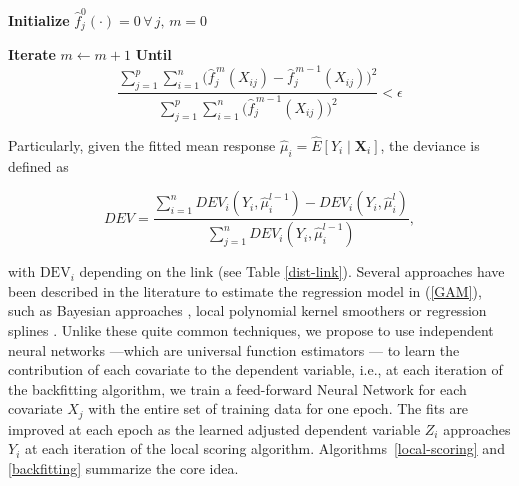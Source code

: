 \begin{algorithm}[ht!]

    \SetAlgoLined
    \caption{Backfitting Algorithm with neural networks}
    \label{backfitting}
        \textbf{Initialize} $\hat f_j^0(\cdot) = 0 \, \forall \, j, \, m = 0 $

        \textbf{Iterate} $m \gets m+1$
            \BlankLine
            \textbf{Until}
            \[
            \frac{ \sum_{j=1}^p \sum_{i=1}^n \bigl(\hat f_j^{\,m}(X_{ij}) - \hat f_j^{\,m-1}(X_{ij})\bigr)^2}
                 { \sum_{j=1}^p \sum_{i=1}^n \bigl(\hat f_j^{\,m-1}(X_{ij})\bigr)^2}
            < \epsilon
            \] \BlankLine
\end{algorithm}

Particularly, given the fitted mean response $\hat{\mu}_i = \hat E[Y_i \mid \textbf{X}_i]$, the deviance is defined as

\[DEV = \frac{\sum_{i=1}^n DEV_i(Y_i, \hat \mu_i^{l-1}) - DEV_i(Y_i, \hat \mu_i^{l})}{\sum_{j=1}^n DEV_i(Y_i, \hat \mu_i^{l-1})},
\]

\noindent with $\text{DEV}_i$ depending on the link (see Table \ref{dist-link}). Several approaches have been described in the literature to estimate the regression model in (\ref{GAM}), such as Bayesian approaches \citep{lang2004bayesian}, local polynomial kernel smoothers \citep{wand1994kernel, copeland1997local} or regression splines \citep{de1978practical}. Unlike these quite common techniques, we propose to use independent neural networks ---which are universal function estimators \citep{hornik1989multilayer}--- to learn the contribution of each covariate to the dependent variable, i.e., at each iteration of the backfitting algorithm, we train a feed-forward Neural Network for each covariate $X_j$ with the entire set of training data for one epoch. The fits are improved at each epoch as the learned adjusted dependent variable $Z_i$ approaches $Y_i$ at each iteration of the local scoring algorithm. Algorithms~\ref{local-scoring} and \ref{backfitting} summarize the core idea.

